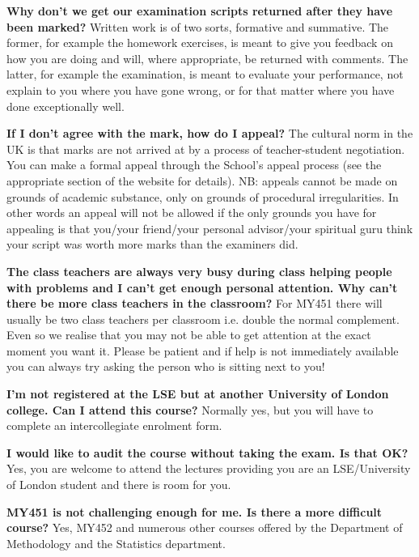 \textbf{Why don't we get our examination scripts returned after they
have been marked?} Written work is of two sorts, formative and
summative. The former, for example the homework exercises, is meant to
give you feedback on how you are doing and will, where appropriate, be
returned with comments. The latter, for example the examination, is
meant to evaluate your performance, not explain to you where you have
gone wrong, or for that matter where you have done exceptionally well.

\textbf{If I don't agree with the mark, how do I appeal?} The cultural norm in
the UK is that marks are not arrived at by a process of teacher-student
negotiation. You can make a formal appeal through the School's appeal
process (see the appropriate section of the website for
details). NB: appeals cannot be made on grounds of academic substance,
only on grounds of procedural irregularities. In other words an appeal
will not be allowed if the only grounds you have for appealing is that
you/your friend/your personal advisor/your spiritual guru think your
script was worth more marks than the examiners did.

\textbf{The class teachers are always very busy during class helping
people with problems and I can't get enough personal attention. Why
can't there be more class teachers in the classroom?} For MY451 there
will usually be two class teachers per classroom i.e. double the normal
complement. Even so we realise that you may not be able to get attention
at the exact moment you want it. Please be patient and if help is not
immediately available you can always try asking the person who is
sitting next to you!

\textbf{I'm not registered at the LSE but at another University of London
college. Can I attend this course?} Normally yes, but you will have to
complete an intercollegiate enrolment form.

\textbf{I would like to audit the course without taking the exam. Is that OK?}
Yes, you are welcome to attend the lectures providing you are an
LSE/University of London student and there is room for you.

\textbf{MY451 is not challenging enough for me. Is there a more
difficult course?} Yes, MY452 and numerous other courses offered by the
Department of Methodology and the Statistics department.

\tableofcontents
\mainmatter
